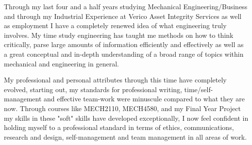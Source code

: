 \documentclass{UoNMCHA}
\numberwithin{equation}{section}
\begin{document}
    Through my last four and a half years studying Mechanical Engineering/Business and through my Industrial Experience at Verico Asset Integrity Services as well as employment I have a completely renewed idea of what engineering truly involves. My time study engineering has taught me methods on how to think critically, parse large amounts of information efficiently and effectively as well as a great conceptual and in-depth understanding of a broad range of topics within mechanical and engineering in general.
    
    My professional and personal attributes through this time have completely evolved, starting out, my standards for professional writing, time/self-management and effective team-work were minuscule compared to what they are now. Through courses like MECH2110, MECH4580, and my Final Year Project my skills in these "soft" skills have developed exceptionally, I now feel confident in holding myself to a professional standard in terms of ethics, communications, research and design, self-management and team management in all areas of work.
    
    
\newpage
\end{document}

